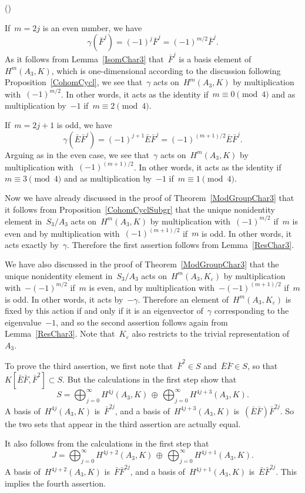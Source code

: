 \documentclass[12pt]{article}
\makeatletter
\newcounter{num}
\newenvironment{pflist}{\begin{list}{(\arabic{num})}{\usecounter{num} \leftmargin0cm \itemindent5pt}}{\end{list}}
\theoremstyle{definition}
\theoremstyle{break}
\renewenvironment{proof}[1][\proofname]{\par
\vspace{-5pt}%
\pushQED{\qed}%
\normalfont
\topsep0pt \partopsep0pt %
\trivlist
\item[\hskip\labelsep
\bfseries
#1\@addpunct{.}]\ignorespaces
}{%
\popQED\endtrivlist\@endpefalse
\addvspace{6pt plus 6pt} %
}
\renewcommand{\1}{\mathbbm{1}}
\makeatother
\begin{document}
\begin{proof}
\begin{pflist}
\item
If~$m=2j$ is an even number, we have
\[\gamma(\bar{F}^j) = (-1)^j \bar{F}^j = (-1)^{m/2} \bar{F}^j.\]
As it follows from Lemma~\ref{IsomChar3} that~$\bar{F}^j$ is a basis element of~$H^m(A_3, K)$, which is one-dimensional according to the discussion following Proposition~\ref{CohomCycl}, we see that~$\gamma$ acts on~$H^m(A_3, K)$ by multiplication with~$(-1)^{m/2}$. In other words, it acts as the identity if~$m \equiv 0 \pmod{4}$ and as multiplication by~$-1$ if~$m \equiv 2 \pmod{4}$.

If~$m=2j+1$ is odd, we have
\[\gamma(\bar{E} \bar{F}^j) = (-1)^{j+1} \bar{E} \bar{F}^j
= (-1)^{(m+1)/2} \bar{E} \bar{F}^j.\]
Arguing as in the even case, we see that~$\gamma$ acts on~$H^m(A_3, K)$ by multiplication
with~$(-1)^{(m+1)/2}$. In other words, it acts as the identity if~$m \equiv 3 \pmod{4}$ and as multiplication by~$-1$ if~$m \equiv 1 \pmod{4}$.

Now we have already discussed in the proof of Theorem~\ref{ModGroupChar3} that it follows from Proposition~\ref{CohomCyclSubgr} that the unique nonidentity element in~$S_3/A_3$ acts on~$H^m(A_3, K)$ by multiplication with~$(-1)^{m/2}$ if~$m$ is even and by multiplication with~$(-1)^{(m+1)/2}$ if~$m$ is odd. In other words, it acts exactly by~$\gamma$. Therefore the first assertion follows from Lemma~\ref{ResChar3}.

\item
We have also discussed in the proof of Theorem~\ref{ModGroupChar3} that the unique nonidentity element in~$S_3/A_3$ acts on~$H^m(A_3, K_\varepsilon)$ by multiplication with~$-(-1)^{m/2}$ if~$m$ is even, and by multiplication with~$-(-1)^{(m+1)/2}$ if~$m$ is odd. In other words, it acts by~$-\gamma$. Therefore an element
of~$H^m(A_3, K_\varepsilon)$ is fixed by this action if and only if it is an eigenvector of~$\gamma$ corresponding to the eigenvalue~$-1$, and so the second assertion follows again from Lemma~\ref{ResChar3}. Note that~$K_\varepsilon$ also restricts to the trivial representation of~$A_3$.

\item
To prove the third assertion, we first note that~$\bar{F}^2 \in S$
and~$\bar{E} \bar{F} \in S$, so that $K[\bar{E} \bar{F}, \bar{F}^2] \subset S$. But the calculations in the first step show that
\[S = \bigoplus_{j=0}^\infty H^{4j}(A_3, K)
\, \oplus \, \bigoplus_{j=0}^\infty H^{4j+3}(A_3, K).\]
A basis of~$H^{4j}(A_3, K)$ is~$\bar{F}^{2j}$, and a basis of~$H^{4j+3}(A_3, K)$
is~$(\bar{E} \bar{F}) \bar{F}^{2j}$. So the two sets that appear in the third assertion are actually equal.

\item
It also follows from the calculations in the first step that
\[J = \bigoplus_{j=0}^\infty H^{4j+2}(A_3, K)
\, \oplus \, \bigoplus_{j=0}^\infty H^{4j+1}(A_3, K).\]
A basis of~$H^{4j+2}(A_3, K)$ is~$\bar{F} \bar{F}^{2j}$, and a basis of~$H^{4j+1}(A_3, K)$
is~$\bar{E} \bar{F}^{2j}$. This implies the fourth assertion.
\qedhere
\end{pflist}
\end{proof}
\end{document}
